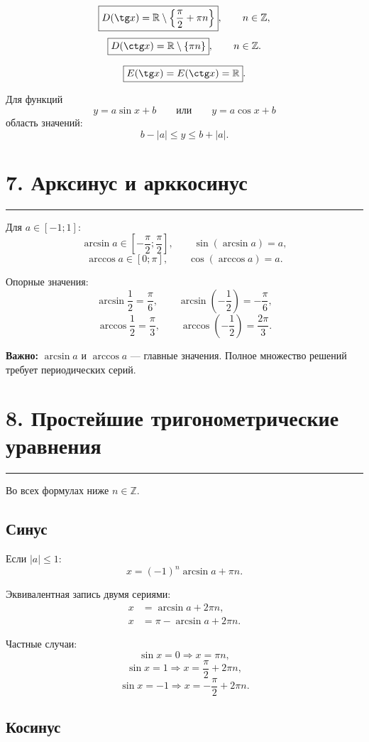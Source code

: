 \documentclass[a4paper,12pt]{article}
\newcommand{\sectionline}{\vspace{-1mm}\noindent\color{accent}\rule{\linewidth}{0.7pt}\color{textgray}\vspace{2mm}}
\newcommand{\key}[1]{\textbf{\color{darkaccent}#1}}
\newcommand{\R}{\mathbb{R}}
\newcommand{\Z}{\mathbb{Z}}
\begin{document}
\[
\boxed{D(\tg x)=\R\setminus\left\{\frac\pi2+\pi n\right\}},
\qquad n\in\Z,
\]
\[
\boxed{D(\ctg x)=\R\setminus\{\pi n\}},
\qquad n\in\Z.
\]

\[
\boxed{E(\tg x)=E(\ctg x)=\R}.
\]

Для функций
\[
y=a\sin x+b
\qquad\text{или}\qquad
y=a\cos x+b
\]
область значений:
\[
\boxed{b-|a|\le y\le b+|a|}.
\]

\section*{7. Арксинус и арккосинус}
\sectionline

Для $a\in[-1;1]$:
\[
\boxed{\arcsin a\in\left[-\frac\pi2;\frac\pi2\right]},
\qquad
\boxed{\sin(\arcsin a)=a},
\]
\[
\boxed{\arccos a\in[0;\pi]},
\qquad
\boxed{\cos(\arccos a)=a}.
\]

Опорные значения:
\[
\arcsin\frac12=\frac\pi6,
\qquad
\arcsin\left(-\frac12\right)=-\frac\pi6,
\]
\[
\arccos\frac12=\frac\pi3,
\qquad
\arccos\left(-\frac12\right)=\frac{2\pi}{3}.
\]

\key{Важно:} $\arcsin a$ и $\arccos a$ --- главные значения. Полное множество решений требует периодических серий.

\section*{8. Простейшие тригонометрические уравнения}
\sectionline

Во всех формулах ниже $n\in\Z$.

\subsection*{Синус}

Если $|a|\le1$:
\[
\boxed{x=(-1)^n\arcsin a+\pi n}.
\]

Эквивалентная запись двумя сериями:
\[
\boxed{
\begin{aligned}
x&=\arcsin a+2\pi n,\\
x&=\pi-\arcsin a+2\pi n.
\end{aligned}}
\]

Частные случаи:
\[
\boxed{\sin x=0\Rightarrow x=\pi n},
\]
\[
\boxed{\sin x=1\Rightarrow x=\frac\pi2+2\pi n},
\]
\[
\boxed{\sin x=-1\Rightarrow x=-\frac\pi2+2\pi n}.
\]

\subsection*{Косинус}
\end{document}
